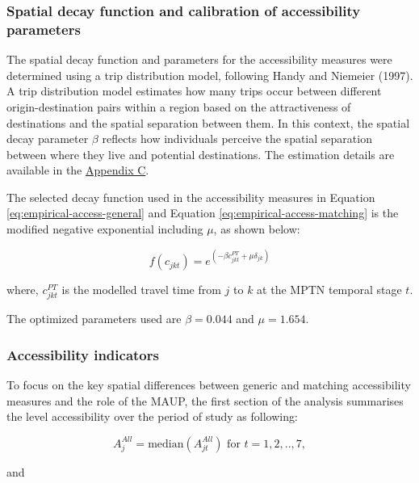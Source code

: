 \documentclass{article}
\begin{document}
\subsubsection{Spatial decay function and calibration of accessibility
parameters}\label{spatial-decay-function-and-calibration-of-accessibility-parameters}

The spatial decay function and parameters for the accessibility measures
were determined using a trip distribution model, following Handy and
Niemeier (1997). A trip distribution model estimates how many trips
occur between different origin-destination pairs within a region based
on the attractiveness of destinations and the spatial separation between
them. In this context, the spatial decay parameter \(\beta\) reflects
how individuals perceive the spatial separation between where they live
and potential destinations. The estimation details are available in the
\hyperref[appendix]{Appendix C}.

The selected decay function used in the accessibility measures in
Equation \ref{eq:empirical-access-general} and Equation
\ref{eq:empirical-access-matching} is the modified negative exponential
including \(\mu\), as shown below:

\begin{equation} 
  f(c_{jkt}) = e^{(-\beta c^{PT}_{jkt} + \mu \delta_{jk})}
\label{eq:seleected-decaying-function}
\end{equation}

where, \(c^{PT}_{jkt}\) is the modelled travel time from \(j\) to \(k\)
at the MPTN temporal stage \(t\).

The optimized parameters used are \(\beta = 0.044\) and \(\mu = 1.654\).

\subsubsection{Accessibility indicators}\label{accessibility-indicators}

To focus on the key spatial differences between generic and matching
accessibility measures and the role of the MAUP, the first section of
the analysis summarises the level accessibility over the period of study
as following:

\begin{equation} 
  A^{All}_{j} = \text{median}(A^{All}_{jt}) \text{ for } t= 1,2,..,7,
\label{eq:median-accessibility-all}
\end{equation}

and
\end{document}
